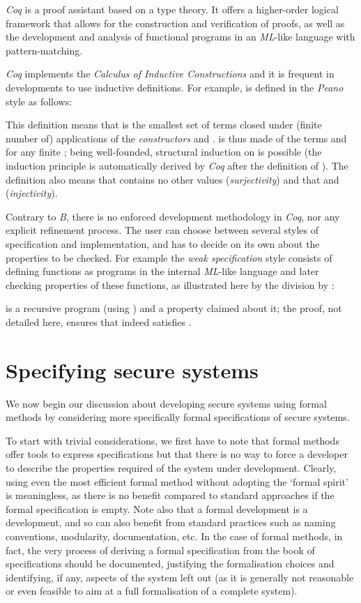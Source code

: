 \documentclass[conference]{IEEEtran}
\begin{document}
\emph{Coq} is a proof assistant based on a type theory. It offers a higher-order logical
framework that allows for the construction and verification of proofs, as well as the
development and analysis of functional programs in an \emph{ML}-like language with
pattern-matching.

\emph{Coq} implements the \emph{Calculus of Inductive Constructions}
\cite{DBLP:conf/colog/CoquandP88} and it is frequent in developments to use inductive
definitions. For example,  is defined in the \emph{Peano} style as follows:

This definition means that {\small}  is the smallest set of terms closed under (finite
number of) applications of the \emph{constructors} {\small} and {\small}. {\small}
is thus made of the terms {\small} and {\small} for any finite {\small}; being
well-founded, structural induction on {\small} is possible (the induction principle is
automatically derived by \emph{Coq} after the definition of {\small}). The definition
also means that {\small} contains no other values (\emph{surjectivity}) and that
{\small} and
{\small} (\emph{injectivity}).

Contrary to \emph{B}, there is no enforced development methodology in \emph{Coq}, nor any
explicit refinement process. The user can choose between several styles of specification and
implementation, and has to decide on its own about the properties to be checked. For example
the \emph{weak specification} style consists of defining functions as programs in the
internal \emph{ML}-like language and later checking properties of these functions, as
illustrated here by the division by {\small}:

{\small} is a recursive program (using
{\small}) and
{\small} a property claimed about it; the proof, not detailed here,
ensures that {\small} indeed satisfies {\small}.

\section{Specifying secure systems}\label{spec_security}

We now begin our discussion about developing secure systems using formal methods by
considering more specifically formal specifications of secure systems.

To start with trivial considerations, we first have to note that formal methods offer tools to
express specifications but that there is no way to force a developer to describe the
properties required of the system under development. Clearly, using even the most efficient
formal method without adopting the `formal spirit' is meaningless, as there is no benefit
compared to standard approaches if the formal specification is empty. Note also that a formal
development is a development, and so can also benefit from standard practices such as naming
conventions, modularity, documentation, etc. In the case of formal methods, in fact, the very
process of deriving a formal specification from the book of specifications should be
documented, justifying the formalisation choices and identifying, if any, aspects of the
system left out (as it is generally not reasonable or even feasible to aim at a full
formalisation of a complete system).
\end{document}
